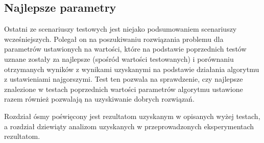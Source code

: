 \subsection{Najlepsze parametry}
Ostatni ze scenariuszy testowych jest niejako podsumowaniem scenariuszy wcześniejszych. Polegał on na poszukiwaniu rozwiązania problemu dla parametrów ustawionych na wartości, które na podstawie poprzednich testów uznane zostały za najlepsze (spośród wartości testowanych) i porównaniu otrzymanych wyników z wynikami uzyskanymi na podstawie działania algorytmu z ustawieniami najgorszymi. Test ten pozwala na sprawdzenie, czy najlepsze znalezione w testach poprzednich wartości parametrów algorytmu ustawione razem również pozwalają na uzyskiwanie dobrych rozwiązań.

Rozdział ósmy poświęcony jest rezultatom uzyskanym w opisanych wyżej testach, a rozdział dziewiąty analizom uzyskanych w przeprowadzonych eksperymentach rezultatom. 